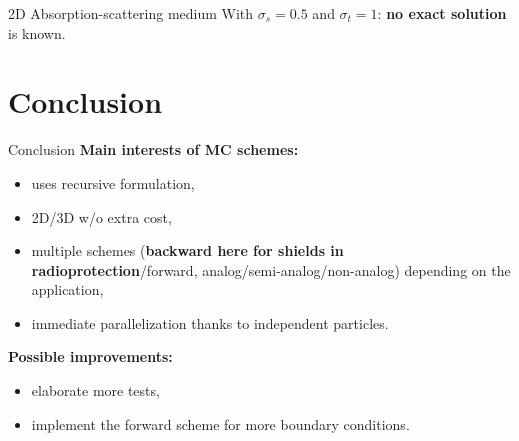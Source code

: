 \documentclass[aspectratio=1610]{beamer}
\def\texttt#1{<#1>}%
\begin{document}
\begin{frame}{2D Absorption-scattering medium}
	With $\sigma_s = 0.5$ and $\sigma_t = 1$: \textbf{no exact solution} is known.
	\begin{figure}[H]
		\centering
		\begin{animateinline}[autoplay,loop,controls=none]{3} 
		\end{animateinline} 
	\end{figure}
\end{frame}



\section{Conclusion}
\begin{frame}{Conclusion}
	\textbf{Main interests of MC schemes:}
	\begin{itemize}
		\item uses recursive formulation,
		\item 2D/3D w/o extra cost,
		\item multiple schemes (\textbf{backward here for shields in radioprotection}/forward, analog/semi-analog/non-analog) depending on the application,
		\item immediate parallelization thanks to independent particles.
	\end{itemize}
	\vspace{1em}
	
	\textbf{Possible improvements:}
	\begin{itemize}
		\item elaborate more tests,
		\item implement the forward scheme for more boundary conditions.
	\end{itemize}
	\label{LastPage}
\end{frame}
\end{document}
